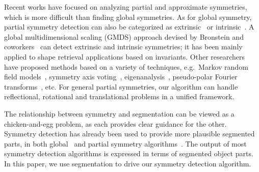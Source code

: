 Recent works have focused on analyzing partial and approximate symmetries, which is more difficult than finding global symmetries. As for global symmetry, partial symmetry detection can also be categorized as extrinsic~\cite{mitra2006,bronstein2009,berner2011} or intrinsic~\cite{lasowski2009,xu2009,mitra2010,raviv2010,bronstein2011}.
A global multidimensional scaling (GMDS) approach devised by Bronstein and coworkers~\cite{bronstein2006,bronstein2009,raviv2010,bronstein2011} can detect  extrinsic and intrinsic symmetries; it has been mainly applied to  shape  retrieval applications based on invariants. Other researchers have proposed  methods based on a variety of techniques, e.g.\ Markov random field models~\cite{lasowski2009}, symmetry axis voting~\cite{xu2009}, eigenanalysis~\cite{lipman2010}, pseudo-polar Fourier transforms~\cite{bermanis2010}, etc.
For general partial symmetries, our algorithm can handle reflectional, rotational and translational problems in a unified framework. 

The relationship between symmetry and segmentation can be viewed as a chicken-and-egg problem, as each provides clear guidance for the other.
Symmetry detection has already been used to provide more plausible segmented parts, in both global~\cite{podolak2006,podolak2007} and partial symmetry algorithms~\cite{xu2009,lipman2010}.
The output of most symmetry detection algorithms is expressed in terms of segmented object parts.
In this paper, we use segmentation to drive our symmetry detection algorithm.

